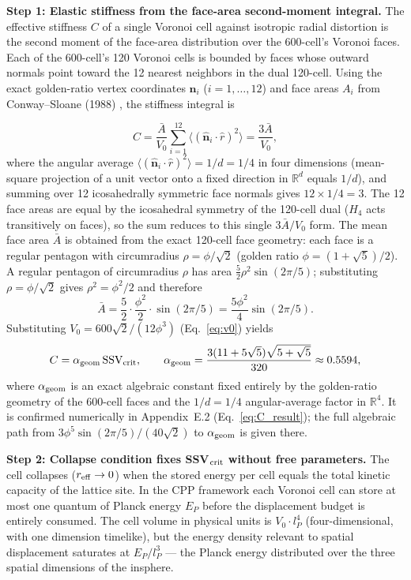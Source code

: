 \documentclass[11pt,letterpaper]{article}
\begin{document}
\textbf{Step 1: Elastic stiffness from the face-area second-moment integral.}
The effective stiffness $C$ of a single Voronoi cell against isotropic radial 
distortion is the second moment of the face-area distribution over the 
600-cell's Voronoi faces. Each of the 600-cell's 120 Voronoi cells is bounded 
by faces whose outward normals point toward the 12 nearest neighbors in the 
dual 120-cell. Using the exact golden-ratio vertex coordinates 
$\mathbf{n}_i$ ($i = 1,\ldots,12$) and face areas $A_i$ from 
Conway--Sloane (1988) \cite{conway1988}, the stiffness integral is

\begin{equation}
C = \frac{\bar{A}}{V_0} \sum_{i=1}^{12} 
    \langle(\hat{\mathbf{n}}_i \cdot \hat{r})^2\rangle
  = \frac{3\bar{A}}{V_0},
\label{eq:C_integral}
\end{equation}
where the angular average $\langle(\hat{\mathbf{n}}_i\cdot\hat{r})^2\rangle = 1/d = 1/4$ 
in four dimensions (mean-square projection of a unit vector onto a fixed direction 
in $\mathbb{R}^d$ equals $1/d$), and summing over 12 icosahedrally symmetric face 
normals gives $12 \times 1/4 = 3$. The 12 face areas are equal by the icosahedral 
symmetry of the 120-cell dual ($H_4$ acts transitively on faces), so the sum 
reduces to this single $3\bar{A}/V_0$ form. The mean face area $\bar{A}$ is 
obtained from the exact 120-cell face geometry: each face is a regular pentagon 
with circumradius $\rho = \phi/\sqrt{2}$ (golden ratio $\phi = (1+\sqrt{5})/2$). 
A regular pentagon of circumradius $\rho$ has area $\frac{5}{2}\rho^2\sin(2\pi/5)$; 
substituting $\rho = \phi/\sqrt{2}$ gives $\rho^2 = \phi^2/2$ and therefore
\[
\bar{A} = \frac{5}{2}\cdot\frac{\phi^2}{2}\cdot\sin(2\pi/5) 
= \frac{5\phi^2}{4}\sin(2\pi/5).
\] Substituting $V_0 = 600\sqrt{2}/(12\phi^3)$ 
(Eq.~\ref{eq:v0}) yields
\begin{equation}
C = \alpha_{\rm geom}\,\text{SSV}_{\rm crit}, \qquad 
\alpha_{\rm geom} = \frac{3(11+5\sqrt{5})\sqrt{5+\sqrt{5}}}{320} 
\approx 0.5594,
\label{eq:C_value_A5}
\end{equation}
where $\alpha_{\rm geom}$ is an exact algebraic constant fixed entirely by the 
golden-ratio geometry of the 600-cell faces and the $1/d = 1/4$ angular-average 
factor in $\mathbb{R}^4$. It is confirmed numerically in Appendix~E.2 
(Eq.~\ref{eq:C_result}); the full algebraic path from $3\phi^5\sin(2\pi/5)/(40\sqrt{2})$ 
to $\alpha_{\rm geom}$ is given there.

\textbf{Step 2: Collapse condition fixes SSV$_{\rm crit}$ without free parameters.}
The cell collapses ($r_{\rm eff} \to 0$) when the stored energy per cell equals 
the total kinetic capacity of the lattice site. In the CPP framework each 
Voronoi cell can store at most one quantum of Planck energy $E_P$ before the 
displacement budget is entirely consumed. The cell volume in physical units is 
$V_0 \cdot l_P^4$ (four-dimensional, with one dimension timelike), but the 
energy density relevant to spatial displacement saturates at $E_P / l_P^3$ — 
the Planck energy distributed over the three spatial dimensions of the insphere.
\end{document}
